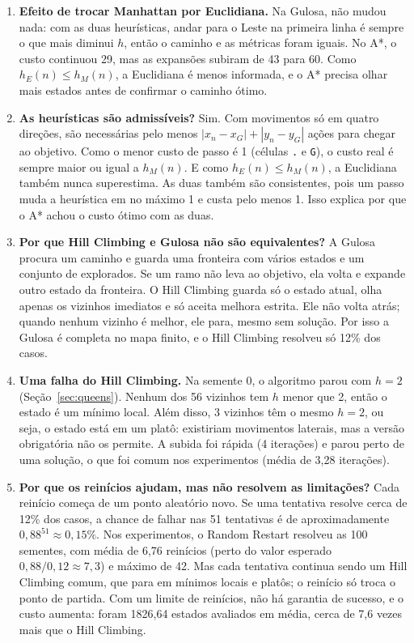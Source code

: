 \documentclass[12pt]{article}
\begin{document}
\begin{enumerate}
\item \textbf{Efeito de trocar Manhattan por Euclidiana.} Na Gulosa, não mudou nada: com as duas heurísticas, andar para o Leste na primeira linha é sempre o que mais diminui $h$, então o caminho e as métricas foram iguais. No A*, o custo continuou 29, mas as expansões subiram de 43 para 60. Como $h_E(n) \le h_M(n)$, a Euclidiana é menos informada, e o A* precisa olhar mais estados antes de confirmar o caminho ótimo.

\item \textbf{As heurísticas são admissíveis?} Sim. Com movimentos só em quatro direções, são necessárias pelo menos $|x_n - x_G| + |y_n - y_G|$ ações para chegar ao objetivo. Como o menor custo de passo é 1 (células \texttt{.} e \texttt{G}), o custo real é sempre maior ou igual a $h_M(n)$. E como $h_E(n) \le h_M(n)$, a Euclidiana também nunca superestima. As duas também são consistentes, pois um passo muda a heurística em no máximo 1 e custa pelo menos 1. Isso explica por que o A* achou o custo ótimo com as duas.

\item \textbf{Por que Hill Climbing e Gulosa não são equivalentes?} A Gulosa procura um caminho e guarda uma fronteira com vários estados e um conjunto de explorados. Se um ramo não leva ao objetivo, ela volta e expande outro estado da fronteira. O Hill Climbing guarda só o estado atual, olha apenas os vizinhos imediatos e só aceita melhora estrita. Ele não volta atrás; quando nenhum vizinho é melhor, ele para, mesmo sem solução. Por isso a Gulosa é completa no mapa finito, e o Hill Climbing resolveu só 12\% dos casos.

\item \textbf{Uma falha do Hill Climbing.} Na semente 0, o algoritmo parou com $h = 2$ (Seção~\ref{sec:queens}). Nenhum dos 56 vizinhos tem $h$ menor que 2, então o estado é um mínimo local. Além disso, 3 vizinhos têm o mesmo $h = 2$, ou seja, o estado está em um platô: existiriam movimentos laterais, mas a versão obrigatória não os permite. A subida foi rápida (4 iterações) e parou perto de uma solução, o que foi comum nos experimentos (média de 3,28 iterações).

\item \textbf{Por que os reinícios ajudam, mas não resolvem as limitações?} Cada reinício começa de um ponto aleatório novo. Se uma tentativa resolve cerca de 12\% dos casos, a chance de falhar nas 51 tentativas é de aproximadamente $0{,}88^{51} \approx 0{,}15\%$. Nos experimentos, o Random Restart resolveu as 100 sementes, com média de 6,76 reinícios (perto do valor esperado $0{,}88/0{,}12 \approx 7{,}3$) e máximo de 42. Mas cada tentativa continua sendo um Hill Climbing comum, que para em mínimos locais e platôs; o reinício só troca o ponto de partida. Com um limite de reinícios, não há garantia de sucesso, e o custo aumenta: foram 1826,64 estados avaliados em média, cerca de 7,6 vezes mais que o Hill Climbing.


\end{enumerate}
\end{document}
